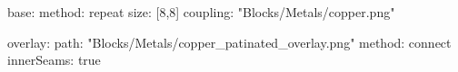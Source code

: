 base:
  method: repeat
  size: [8,8]
  coupling: "Blocks/Metals/copper.png"
  
overlay:
  path: "Blocks/Metals/copper_patinated_overlay.png"
  method: connect
  innerSeams: true
